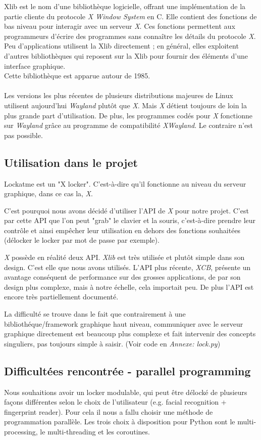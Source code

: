 \documentclass[french]{report}
\begin{document}
Xlib est le nom d'une bibliothèque logicielle, offrant une implémentation de la
partie cliente du protocole \emph{X Window System} en C. Elle contient des fonctions
de bas niveau pour interagir avec un serveur \emph{X}. Ces fonctions permettent aux
programmeurs d'écrire des programmes sans connaître les détails du protocole \emph{X}.
Peu d'applications utilisent la Xlib directement ; en général, elles exploitent
d'autres bibliothèques qui reposent sur la Xlib pour fournir des éléments
d'une interface graphique.\\
Cette bibliothèque est apparue autour de 1985.\\\\
Les versions les plus récentes de plusieurs distributions majeures de Linux utilisent
aujourd'hui \emph{Wayland} plutôt que \emph{X}. Mais \emph{X} détient toujours de loin la plus
grande part d'utilisation. De plus, les programmes codés pour \emph{X} fonctionne
sur \emph{Wayland} grâce au programme de compatibilité \emph{XWayland}. Le contraire n'est pas
possible.

\subsection{Utilisation dans le projet}

Lockatme est un "X locker". C'est-à-dire qu'il fonctionne au niveau du serveur graphique,
dans ce cas la, \emph{X}.

C'est pourquoi nous avons décidé d'utiliser l'API de \emph{X} pour notre projet. C'est par
cette API que l'on peut "grab" le clavier et la souris, c'est-à-dire prendre leur contrôle
et ainsi empêcher leur utilisation en dehors des fonctions souhaitées (délocker le
locker par mot de passe par exemple).

\emph{X} possède en réalité deux API. \emph{Xlib} est très utilisée et plutôt
simple dans son design.
C'est elle que nous avons utilisés. L'API plus récente, \emph{XCB}, présente un
avantage conséquent de performance sur des grosses applications, de par son design
plus complexe, mais à notre échelle, cela importait peu. De plus l'API est encore
très partiellement documenté.

La difficulté se trouve dans le fait que contrairement à une bibliothéque/framework
graphique haut niveau, communiquer avec le serveur graphique directement est
beaucoup plus complexe et fait intervenir des concepts singuliers, pas toujours
simple à saisir. (Voir code en \emph{Annexe: lock.py})

\subsection{Difficultées rencontrée - parallel programming}
Nous souhaitions avoir un locker modulable, qui peut être délocké de plusieurs
façons différentes selon le choix de l'utilisateur (e.g. facial recognition
+ fingerprint reader). Pour cela il nous a fallu choisir une méthode de programmation
parallèle. Les trois choix à disposition pour Python sont le multi-processing,
le multi-threading et les coroutines.
\end{document}
